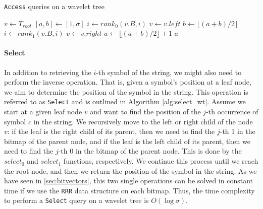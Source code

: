 \begin{algorithm}[h!]
    \caption{\texttt{Access} queries on a wavelet tree}\label{alg:access_wt}
    \begin{algorithmic}
         
        \State $v \gets T_{root}$ 
        \State $[a,b] \gets [1,\sigma]$
         
        \State $i \gets rank_0(v.B,i)$
        \State $v \gets v.left$ 
        \State $b \gets \lfloor (a+b)/2 \rfloor$
        \Else
        \State $i \gets rank_1(v.B,i)$
        \State $v \gets v.right$ 
        \State $a \gets \lfloor (a+b)/2 \rfloor +1$
        \EndIf
        \EndWhile
        \State \Return $a$
        \EndFunction
    \end{algorithmic}
\end{algorithm}


\paragraph{Select} In addition to retrieving the $i$-th symbol of the string, we might also need to perform the inverse operation. That is, given a symbol's position at a leaf node, we aim to determine the position of the symbol in the string. This operation is referred to as \texttt{Select} and is outlined in Algorithm \ref{alg:select_wt}. Assume we start at a given leaf node $v$ and want to find the position of the $j$-th occurrence of symbol $c$ in the string. We recursively move to the left or right child of the node $v$: if the leaf is the right child of its parent, then we need to find the $j$-th 1 in the bitmap of the parent node, and if the leaf is the left child of its parent, then we need to find the $j$-th 0 in the bitmap of the parent node. This is done by the $select_0$ and $select_1$ functions, respectively. We continue this process until we reach the root node, and then we return the position of the symbol in the string. As we have seen in \autoref{sec:bitvectors}, this two single operations can be solved in constant time if we use the \texttt{RRR} data structure \cite{RRR2002} on each bitmap. Thus, the time complexity to perform a \texttt{Select} query on a wavelet tree is $O(\log \sigma)$.

